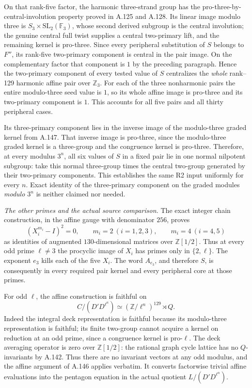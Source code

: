 On that rank-five factor, the harmonic three-strand
group has the pro-three-by-central-involution property
proved in A.125 and A.128.  Its linear image modulo
three is $S_3\times\mathrm{SL}_2(\mathbb F_3)$, whose
second derived subgroup is the central involution;
the genuine central full twist supplies a central
two-primary lift, and the remaining kernel is
pro-three.  Since every peripheral substitution of
$S$ belongs to $F''$, its rank-five two-primary
component is central in the pair image.  On the
complementary factor that component is $1$ by the
preceding paragraph.  Hence the two-primary component
of every tested value of $S$ centralizes the \emph{whole}
rank--129 harmonic affine pair over $\mathbb Z_3$.
For each of the three nonharmonic pairs the entire
modulo-three seed value is $1$, so its whole affine
image is pro-three and its two-primary component is
$1$.  This accounts for all five pairs and all thirty
peripheral cases.

Its three-primary component lies in the inverse image
of the modulo-three graded kernel from A.147.  That
inverse image is pro-three, since the modulo-three
graded kernel is a three-group and the congruence
kernel is pro-three.  Therefore, at every modulus
$3^n$, all six values of $S$ in a fixed pair lie in
one normal nilpotent subgroup: take this normal
three-group times the central two-group generated by
their two-primary components.  This establishes the
same R2 input uniformly for every $n$.  Exact identity
of the three-primary component on the graded modules
\emph{modulo $3^n$} is neither claimed nor needed.

\emph{The other primes and the actual source comparison.}
The exact integer chain construction, in the affine
gauge with denominator $256$, proves
\[
 (X_i^{m_i}-I)^2=0,\qquad
 m_i=2\ (i=1,2,3),\qquad m_i=4\ (i=4,5)
\]
as identities of augmented $130$-dimensional matrices
over $\mathbb Z[1/2]$.  Thus at every odd prime
$\ell\ne3$ the procyclic image of $X_i$ has primes
only in $\{2,\ell\}$.  The exponent $e_3$ kills each
of the five $X_i$.  The word $A_{e_3}$, and therefore
$S$, is consequently in every required pair kernel
and every peripheral core at those primes.

For odd $\ell$, the affine construction is faithful
on
\[
 C/(D'D^{\ell^n})\simeq
       (\mathbb Z/\ell^n)^{129}\rtimes Q.
\]
Indeed the integral deck representation is faithful
because its modulo-three representation is faithful;
its finite two-group cannot acquire a kernel on
reduction at an odd prime, since a congruence kernel
is pro-$\ell$.  The deck averaging operator is zero
over $\mathbb Z[1/2]$: the rational graph cycle lattice
has no $Q$-invariants by A.142.  Thus there are no invariant
vectors at any odd modulus, and the affine argument
of A.146 applies verbatim.  It converts factorwise
trivial affine evaluations into the pentagon equation
in the actual quotient $L/(D'D^{\ell^n})$.

